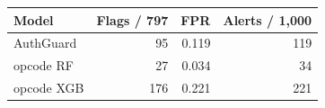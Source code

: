 \begin{tabular}{lrrr}
\toprule
Model & Flags / 797 & FPR & Alerts / 1,000 \\
\midrule
AuthGuard & 95 & 0.119 & 119 \\
opcode RF & 27 & 0.034 & 34 \\
opcode XGB & 176 & 0.221 & 221 \\
\bottomrule
\end{tabular}
